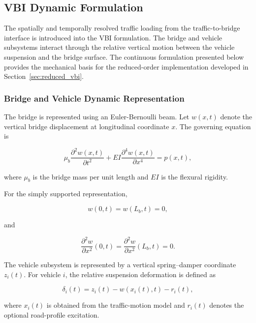 \documentclass[journal]{IEEEtran}
\begin{document}
\subsection{VBI Dynamic Formulation}
\label{sec:vbi_dynamic_formulation}

The spatially and temporally resolved traffic loading from the traffic-to-bridge interface is introduced into the VBI formulation. The
bridge and vehicle subsystems interact through the relative vertical motion
between the vehicle suspension and the bridge surface. The continuous
formulation presented below provides the mechanical basis for the reduced-order
implementation developed in Section~\ref{sec:reduced_vbi}.


\subsubsection{Bridge and Vehicle Dynamic Representation}

The bridge is represented using an Euler-Bernoulli beam. Let $w(x,t)$ denote the vertical bridge displacement at longitudinal coordinate $x$. The governing equation is

\begin{equation}
\mu_b
\frac{\partial^2 w(x,t)}{\partial t^2}
+
EI
\frac{\partial^4 w(x,t)}{\partial x^4}
=
p(x,t),
\end{equation}

where $\mu_b$ is the bridge mass per unit length and $EI$ is the flexural rigidity.

For the simply supported representation,

\begin{equation}
w(0,t)=w(L_b,t)=0,
\end{equation}

and

\begin{equation}
\frac{\partial^2 w}{\partial x^2}(0,t)
=
\frac{\partial^2 w}{\partial x^2}(L_b,t)
=
0.
\end{equation}

The vehicle subsystem is represented by a vertical spring--damper
coordinate $z_i(t)$. For vehicle $i$, the relative suspension deformation is defined as

\begin{equation}
\delta_i(t)
=
z_i(t)
-
w\!\left(x_i(t),t\right)
-
r_i(t),
\end{equation}

where $x_i(t)$ is obtained from the traffic-motion model and $r_i(t)$ denotes the optional road-profile excitation.
\end{document}
